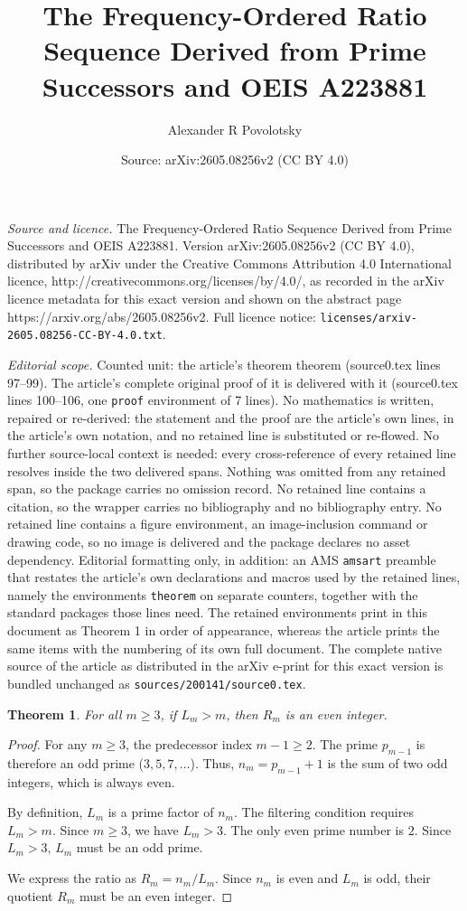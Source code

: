 \documentclass[10pt,a4paper]{amsart}
\title{The Frequency-Ordered Ratio Sequence Derived from Prime Successors and OEIS A223881}
\author{Alexander R Povolotsky}
\date{Source: arXiv:2605.08256v2 (CC BY 4.0)}
\newtheorem{theorem}{Theorem}
\begin{document}
\maketitle

\noindent\emph{Source and licence.} The Frequency-Ordered Ratio Sequence Derived from Prime Successors and OEIS A223881. Version arXiv:2605.08256v2 (CC BY 4.0), distributed by arXiv under the Creative Commons Attribution 4.0 International licence, http://creativecommons.org/licenses/by/4.0/, as recorded in the arXiv licence metadata for this exact version and shown on the abstract page https://arxiv.org/abs/2605.08256v2. Full licence notice: \texttt{licenses/arxiv-2605.08256-CC-BY-4.0.txt}.\par\smallskip

\noindent\textit{Editorial scope.} Counted unit: the article's theorem theorem (source0.tex lines 97--99). The article's complete original proof of it is delivered with it (source0.tex lines 100--106, one \texttt{proof} environment of 7 lines). No mathematics is written, repaired or re-derived: the statement and the proof are the article's own lines, in the article's own notation, and no retained line is substituted or re-flowed.  No further source-local context is needed: every cross-reference of every retained line resolves inside the two delivered spans.  Nothing was omitted from any retained span, so the package carries no omission record.  No retained line contains a citation, so the wrapper carries no bibliography and no bibliography entry.  No retained line contains a figure environment, an image-inclusion command or drawing code, so no image is delivered and the package declares no asset dependency.  Editorial formatting only, in addition: an AMS \texttt{amsart} preamble that restates the article's own declarations and macros used by the retained lines, namely the environments \texttt{theorem} on separate counters, together with the standard packages those lines need.  The retained environments print in this document as Theorem 1 in order of appearance, whereas the article prints the same items with the numbering of its own full document.  The complete native source of the article as distributed in the arXiv e-print for this exact version is bundled unchanged as \texttt{sources/200141/source0.tex}.
\begin{theorem}
For all $m \geq 3$, if $L_m > m$, then $R_m$ is an even integer.
\end{theorem}

\begin{proof}
For any $m \geq 3$, the predecessor index $m-1 \geq 2$. The prime $p_{m-1}$ is therefore an odd prime ($3, 5, 7, \dots$). Thus, $n_m = p_{m-1} + 1$ is the sum of two odd integers, which is always even. 

By definition, $L_m$ is a prime factor of $n_m$. The filtering condition requires $L_m > m$. Since $m \geq 3$, we have $L_m > 3$. The only even prime number is $2$. Since $L_m > 3$, $L_m$ must be an odd prime.

We express the ratio as $R_m = n_m / L_m$. Since $n_m$ is even and $L_m$ is odd, their quotient $R_m$ must be an even integer.
\end{proof}
\end{document}
